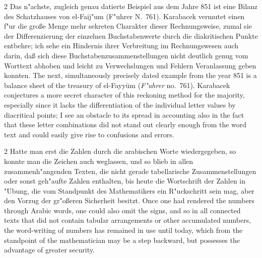 \documentclass[10pt,a4paper]{article}
\renewcommand{\switchcolumn}{\syncronize\nointerlineskip\columnbreak}
\begin{document}
\begin{paracol}{2}
Das n"achste, zugleich genau datierte Beispiel aus dem Jahre 851 ist eine Bilanz des Schatzhauses von el-Faij"um (F"uhrer N.\ 761). Karabacek vermutet einen f"ur die gro\ss{}e Menge mehr sekreten Charakter dieser Rechnungsweise, zumal sie der Differenzierung der einzelnen Buchstabenwerte durch die diakritischen Punkte entbehre; ich sehe ein Hindernis ihrer Verbreitung im Rechnungswesen auch darin, da\ss{} sich diese Buchstabenzusammenstellungen nicht deutlich genug vom Worttext abhoben und leicht zu Verwechslungen und Fehlern Veranlassung geben konnten.
\switchcolumn
The next, simultaneously precisely dated example from the year 851 is a balance sheet of the treasury of el-Fayy\=um (\textit{F"uhrer} no.\ 761). Karabacek conjectures a more secret character of this reckoning method for the majority, especially since it lacks the differentiation of the individual letter values by diacritical points; I see an obstacle to its spread in accounting also in the fact that these letter combinations did not stand out clearly enough from the word text and could easily give rise to confusions and errors.
\end{paracol}

\begin{paracol}{2}
Hatte man erst die Zahlen durch die arabischen Worte wiedergegeben, so konnte man die Zeichen auch weglassen, und so blieb in allen zusammenh"angenden Texten, die nicht gerade tabellarische Zusammenstellungen oder sonst geh"aufte Zahlen enthalten, bis heute die Wortschrift der Zahlen in "Ubung, die vom Standpunkt des Mathematikers ein R"uckschritt sein mag, aber den Vorzug der gr"o\ss{}eren Sicherheit besitzt.
\switchcolumn
Once one had rendered the numbers through Arabic words, one could also omit the signs, and so in all connected texts that did not contain tabular arrangements or other accumulated numbers, the word-writing of numbers has remained in use until today, which from the standpoint of the mathematician may be a step backward, but possesses the advantage of greater security.
\end{paracol}
\end{document}
